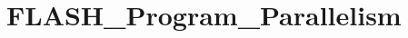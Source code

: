 \hypertarget{group___f_l_a_s_h___program___parallelism}{\section{F\-L\-A\-S\-H\-\_\-\-Program\-\_\-\-Parallelism}
\label{group___f_l_a_s_h___program___parallelism}
}

